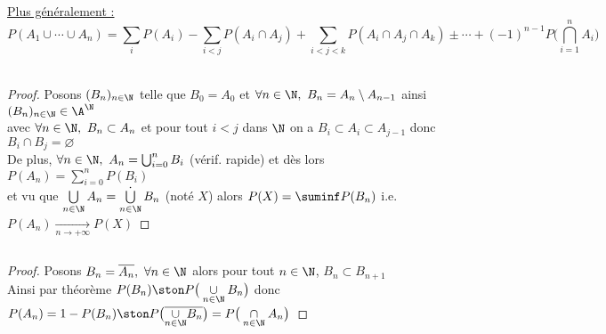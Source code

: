 		\vspace*{0.3cm} \\
		\uline{Plus généralement :} 
		\[ P(A_1\cup \cdots \cup A_n ) = \sum_i P(A_i) - \sum_{i<j} P(A_i\cap A_j) + \sum_{i<j<k} P(A_i\cap A_j\cap A_k) \pm \cdots + (-1)^{n-1}P\big( \bigcap_{i=1}^n A_i\big) \]
		\vspace*{0.5cm} \\
		\begin{proof}
		Posons $(B_n)_{n\in \N}$ telle que $B_0=A_0$ et $\forall n\in \N, ~B_n = A_n \setminus A_{n-1}$ ainsi $(B_n)_{n\in \N} \in \A^{\N}$ \\
		avec $\forall n\in \N ,~ B_n \subset A_n $ et pour tout $i<j$ dans $\N$ on a $B_i\subset A_i \subset A_{j-1}$ donc $B_i\cap B_j = \varnothing$\\
		De plus, $\forall n\in \N ,~A_n = \bigcup_{i=0}^n B_i$ (vérif. rapide) et dès lors $P(A_n) = \sum_{i=0}^n P(B_i)$ \\
		et vu que $\bigcup\limits_{n\in\N} A_n = \bigcup\limits_{n\in\N}^{\textbf{.}} B_n$ (noté $X$)
		alors $P(X) = \suminf P(B_n)$ i.e. $P(A_n) \underset{n\to +\infty}{\longrightarrow} P(X)$
		\end{proof}
		${}$ \vspace*{0.5cm} \\
		\begin{proof}
		Posons $B_n = \overline{A_n} ,~\forall n\in \N$ alors pour tout $n\in\N $, $B_n \subset B_{n+1}$ \\
		Ainsi par théorème $P(B_n) \ston P\big( \underset{n\in\N}{\cup} B_n\big)$ donc $P(A_n) = 1-P(B_n) \ston P\big( \overline{\underset{n\in\N}{\cup} B_n}\big) = P\big( \underset{n\in\N}{\cap} A_n\big)$
		\end{proof}
